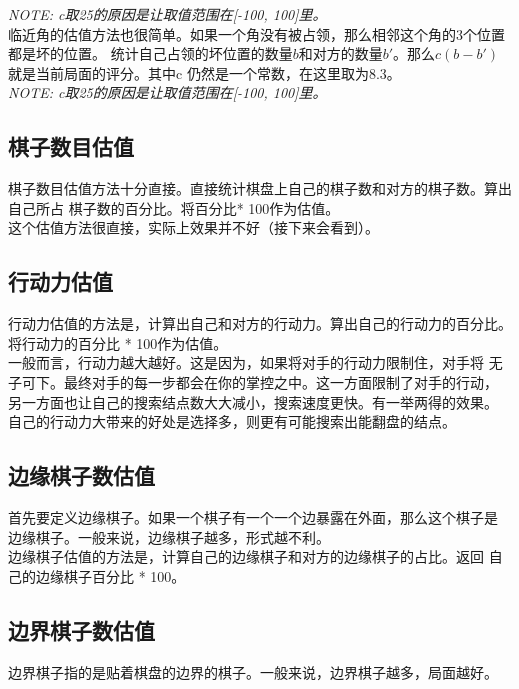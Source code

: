 \documentclass[a4paper]{article}
\begin{document}
\emph{NOTE: c取25的原因是让取值范围在[-100, 100]里。}\\

临近角的估值方法也很简单。如果一个角没有被占领，那么相邻这个角的3个位置都是坏的位置。
统计自己占领的坏位置的数量$b$和对方的数量$b'$。那么$c(b - b')$就是当前局面的评分。其中c
仍然是一个常数，在这里取为8.3。\\

\emph{NOTE: c取25的原因是让取值范围在[-100, 100]里。}\\

\subsection{棋子数目估值}
棋子数目估值方法十分直接。直接统计棋盘上自己的棋子数和对方的棋子数。算出自己所占
棋子数的百分比。将百分比* 100作为估值。\\

这个估值方法很直接，实际上效果并不好（接下来会看到）。\\

\subsection{行动力估值}
行动力估值的方法是，计算出自己和对方的行动力。算出自己的行动力的百分比。
将行动力的百分比 * 100作为估值。 \\

一般而言，行动力越大越好。这是因为，如果将对手的行动力限制住，对手将
无子可下。最终对手的每一步都会在你的掌控之中。这一方面限制了对手的行动，
另一方面也让自己的搜索结点数大大减小，搜索速度更快。有一举两得的效果。\\

自己的行动力大带来的好处是选择多，则更有可能搜索出能翻盘的结点。

\subsection{边缘棋子数估值}
首先要定义边缘棋子。如果一个棋子有一个一个边暴露在外面，那么这个棋子是
边缘棋子。一般来说，边缘棋子越多，形式越不利。\\

边缘棋子估值的方法是，计算自己的边缘棋子和对方的边缘棋子的占比。返回
自己的边缘棋子百分比 * 100。

\subsection{边界棋子数估值}
边界棋子指的是贴着棋盘的边界的棋子。一般来说，边界棋子越多，局面越好。\\
\end{document}
